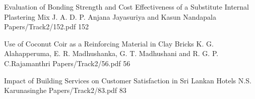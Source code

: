         

        
        \addpaper
    	{Evaluation of Bonding Strength and Cost Effectiveness of a Substitute Internal Plastering Mix}
   		 {J. A. D. P. Anjana Jayasuriya and Kasun Nandapala} 
   		 {Papers/Track2/152.pdf}
        {152} 

        

        

        
         \addpaper
    	{Use of Coconut Coir as a Reinforcing Material in Clay Bricks}
   		 {K. G. Alahapperuma, E. R. Madhushanka, G. T. Madhushani and R. G. P. C.Rajamanthri} 
   		 {Papers/Track2/56.pdf}
        {56} 

        

        
         \addpaper
    	{Impact of Building Services on Customer Satisfaction in Sri Lankan Hotels}
   		 {N.S. Karunasinghe} 
   		 {Papers/Track2/83.pdf}
        {83} 

        

        

        

        

